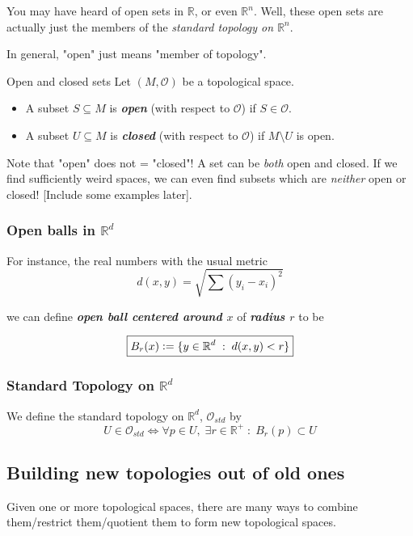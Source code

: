 \documentclass{article}
\newcommand{\R}{\mathbb{R}}
\newcommand{\defeq}{\vcentcolon=}
\begin{document}
\vskip 0.5cm
You may have heard of open sets in $\R$, or even $\R^n$. Well, these open sets are actually just the members of the \emph{standard topology on $\R^n$}.

\vskip 0.5cm
In general, "open" just means "member of topology".
\begin{mathdefinitionbox}{Open and closed sets}
  Let $(M, \mathcal{O})$ be a topological space.
  \begin{itemize}
    \item A subset $S \subseteq M$ is \emph{\textbf{open}} (with respect to $\mathcal{O}$) if $S \in \mathcal{O}$.
    \item A subset $U \subseteq M$ is \emph{\textbf{closed}} (with respect to $\mathcal{O}$) if $M \setminus U$ is open.
  \end{itemize}
  Note that "open" does not = "closed"! A set can be \emph{both} open and closed. If we find sufficiently weird spaces, we can even find subsets which are \emph{neither} open or closed! [Include some examples later].
\end{mathdefinitionbox}

\vskip 0.5cm
\subsubsection*{Open balls in $\R^d$}

For instance, the real numbers with the usual metric 
\[ d(x, y) = \sqrt{\sum (y_i - x_i)^2} \]

we can define \emph{\textbf{open ball centered around $x$}} of \textbf{\emph{radius $r$}} to be 

\[ \boxed{ B_r(x) \defeq \{ y \in \R^d \;:\; d(x, y) < r  \} } \]

\vskip 0.5cm
\subsubsection*{Standard Topology on $\R^d$}
We define the standard topology on $\R^d$, $\mathcal{O}_{std}$ by 
\[ U \in \mathcal{O}_{std} \iff \forall p \in U, \; \exists r \in \R^{+} \;:\; B_r(p) \subset U  \]

\vskip 0.5cm
\subsection{Building new topologies out of old ones}
Given one or more topological spaces, there are many ways to combine them/restrict them/quotient them to form new topological spaces.
\end{document}
